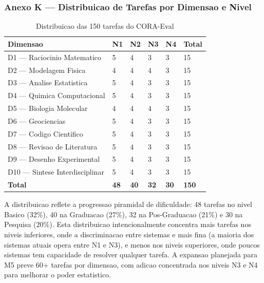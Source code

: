 \subsubsection{Anexo K --- Distribuicao de Tarefas por Dimensao e Nivel}

\begin{table}[H]\centering\footnotesize
\caption{Distribuicao das 150 tarefas do CORA-Eval}
\label{tab:task-dist}
\begin{tabular}{p{}p{}p{}p{}p{}p{}}
\toprule
\textbf{Dimensao} & \textbf{N1} & \textbf{N2} & \textbf{N3} & \textbf{N4} & \textbf{Total} \\
\midrule
D1 --- Raciocinio Matematico & 5 & 4 & 3 & 3 & 15 \\
D2 --- Modelagem Fisica & 4 & 4 & 4 & 3 & 15 \\
D3 --- Analise Estatistica & 5 & 4 & 3 & 3 & 15 \\
D4 --- Quimica Computacional & 5 & 4 & 3 & 3 & 15 \\
D5 --- Biologia Molecular & 4 & 4 & 4 & 3 & 15 \\
D6 --- Geociencias & 5 & 4 & 3 & 3 & 15 \\
D7 --- Codigo Cientifico & 5 & 4 & 3 & 3 & 15 \\
D8 --- Revisao de Literatura & 5 & 4 & 3 & 3 & 15 \\
D9 --- Desenho Experimental & 5 & 4 & 3 & 3 & 15 \\
D10 --- Sintese Interdisciplinar & 5 & 4 & 3 & 3 & 15 \\
\midrule
\textbf{Total} & \textbf{48} & \textbf{40} & \textbf{32} & \textbf{30} & \textbf{150} \\
\bottomrule
\end{tabular}
\end{table}

A distribuicao reflete a progressao piramidal de dificuldade: 48 tarefas
no nivel Basico (32\%), 40 na Graduacao (27\%), 32 na Pos-Graduacao
(21\%) e 30 na Pesquisa (20\%). Esta distribuicao intencionalmente
concentra mais tarefas nos niveis inferiores, onde a discriminacao entre
sistemas e mais fina (a maioria dos sistemas atuais opera entre N1 e N3),
e menos nos niveis superiores, onde poucos sistemas tem capacidade de
resolver qualquer tarefa. A expansao planejada para M5 preve 60+ tarefas
por dimensao, com adicao concentrada nos niveis N3 e N4 para melhorar o
poder estatistico.


